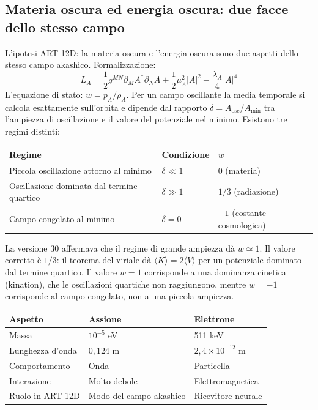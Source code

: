 \documentclass[11pt,a4paper]{article}
\begin{document}
\subsection{Materia oscura ed energia oscura: due facce dello stesso campo}
L'ipotesi ART-12D: la materia oscura e l'energia oscura sono due aspetti dello stesso campo akashico. Formalizzazione:
\begin{equation}
L_A = \frac{1}{2} g^{MN} \partial_M A^* \partial_N A + \frac{1}{2} \mu_A^2 |A|^2 - \frac{\lambda_A}{4} |A|^4
\end{equation}
L'equazione di stato: $w = p_A / \rho_A$. Per un campo oscillante la media temporale si calcola esattamente sull'orbita e dipende dal rapporto $\delta = A_{\text{osc}}/A_{\min}$ tra l'ampiezza di oscillazione e il valore del potenziale nel minimo. Esistono tre regimi distinti:
\begin{center}
\begin{tabular}{@{}lll@{}}
\toprule
\textbf{Regime} & \textbf{Condizione} & $w$ \\ \midrule
Piccola oscillazione attorno al minimo & $\delta \ll 1$ & $0$ (materia) \\
Oscillazione dominata dal termine quartico & $\delta \gg 1$ & $1/3$ (radiazione) \\
Campo congelato al minimo & $\delta = 0$ & $-1$ (costante cosmologica) \\ \bottomrule
\end{tabular}
\end{center}
La versione 30 affermava che il regime di grande ampiezza dà $w \simeq 1$. Il valore corretto è $1/3$: il teorema del viriale dà $\langle K \rangle = 2\langle V \rangle$ per un potenziale dominato dal termine quartico. Il valore $w = 1$ corrisponde a una dominanza cinetica (kination), che le oscillazioni quartiche non raggiungono, mentre $w = -1$ corrisponde al campo congelato, non a una piccola ampiezza.
\begin{table}[H]
\centering
\begin{tabular}{@{}lll@{}}
\toprule
\textbf{Aspetto} & \textbf{Assione} & \textbf{Elettrone} \\ \midrule
Massa & \(10^{-5}\) eV & 511 keV \\
Lunghezza d'onda & \(0,124\) m & \(2,4\times10^{-12}\) m \\
Comportamento & Onda & Particella \\
Interazione & Molto debole & Elettromagnetica \\
Ruolo in ART-12D & Modo del campo akashico & Ricevitore neurale \\ \bottomrule
\end{tabular}
\end{table}
\end{document}

